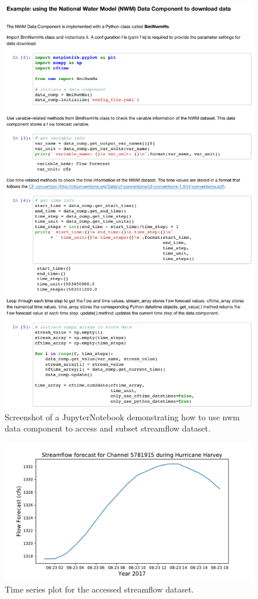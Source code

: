 \documentclass[12pt]{amsart}
\begin{document}
\begin{figure}[h!]
\centering
\includegraphics[scale=0.8]{Figures/nwm_example_notebook.pdf}
\caption{Screenshot of a JupyterNotebook demonstrating how to use nwm data component to access and subset streamflow dataset. }
\label{fig:data_component1}
\end{figure}

\begin{figure}[h!]
\centering
\includegraphics[scale=0.5]{Figures/nwm_hydrograph.pdf}
\caption{Time series plot for the accessed streamflow dataset. }
\label{fig:data_component2}
\end{figure}
\end{document}
